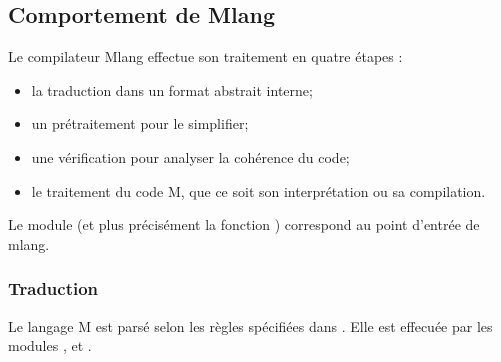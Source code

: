 \documentclass[letterpaper,10pt,french]{sphinxmanual}
\begin{document}
\begin{sphinxVerbatim}[commandchars=\\\{\}]
           

            

           

           

            
\end{sphinxVerbatim}


\subsection{Comportement de Mlang}
\label{\detokenize{mlang:comportement-de-mlang}}
\sphinxAtStartPar
Le compilateur Mlang effectue son traitement en quatre étapes :
\begin{itemize}
\item {} 
\sphinxAtStartPar
la traduction dans un format abstrait interne;

\item {} 
\sphinxAtStartPar
un pré\sphinxhyphen{}traitement pour le simplifier;

\item {} 
\sphinxAtStartPar
une vérification pour analyser la cohérence du code;

\item {} 
\sphinxAtStartPar
le traitement du code M, que ce soit son interprétation ou sa compilation.

\end{itemize}

\sphinxAtStartPar
Le module  (et plus précisément la fonction ) correspond au
point d’entrée de mlang.


\subsubsection{Traduction}
\label{\detokenize{mlang:traduction}}
\sphinxAtStartPar
Le langage M est parsé selon les règles spécifiées dans {\hyperref[\detokenize{syntax:syntax}]{}}.
Elle est effecuée par les modules ,  et .
\end{document}
